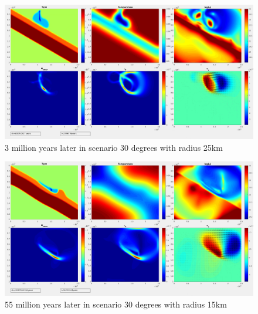 \documentclass[12pt]{scrreprt}
\begin{document}
\begin{figure}[!ht]
\begin{minipage}[t]{1.0\textwidth}
\includegraphics[width=1.0\textwidth]{./Snapshots/ref/Subductionzonewithblobpos1slab30s1e7r25.jpg}
\end{minipage}
\caption{3 million years later in scenario 30 degrees with radius 25km}
\label{fig:3m3025km}
\end{figure}
\begin{figure}[!ht]
\begin{minipage}[t]{1.0\textwidth}
\includegraphics[width=1.0\textwidth]{./Snapshots/ref/Subductionzonewithblobpos1slab30s1e7r15.jpg}
\end{minipage}
\caption{55 million years later in scenario 30 degrees with radius 15km}
\label{fig:55m3015km}
\end{figure}

\end{document}
